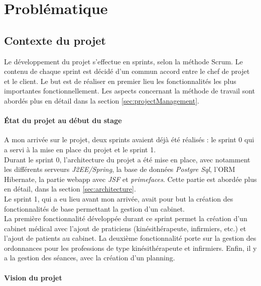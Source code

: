 \newpage
\section{Problématique} %

\subsection{Contexte du projet}
Le développement du projet s'effectue en sprints, selon la méthode Scrum. Le contenu de chaque sprint est décidé d'un commun accord entre le chef de projet et le client. Le but est de réaliser en premier lieu les fonctionnalités les plus importantes fonctionnellement. 
Les aspects concernant la méthode de travail sont abordés plus en détail dans la section \ref{sec:projectManagement}.

\paragraph*{État du projet au début du stage\\}
A mon arrivée sur le projet, deux sprints avaient déjà été réalisés : le sprint 0 qui a servi à la mise en place du projet et le sprint 1.\\

Durant le sprint 0, l'architecture du projet a été mise en place, avec notamment les différents serveurs \textit{J2EE/Spring}, la base de données \textit{Postgre Sql}, l'\gls{ORM} Hibernate, la partie webapp avec \textit{JSF} et \textit{primefaces}.
Cette partie est abordée plus en détail, dans la section \ref{sec:architecture}.\\

Le sprint 1, qui a eu lieu avant mon arrivée, avait pour but la création des fonctionnalités de base permettant la gestion d'un cabinet.\\
La première fonctionnalité développée durant ce sprint permet la création d'un cabinet médical avec l'ajout de praticiens (kinésithérapeute, infirmiers, etc.) et l'ajout de patients au cabinet.
La deuxième fonctionnalité porte sur la gestion des ordonnances pour les professions de type kinésithérapeute et infirmiers. Enfin, il y a la gestion des séances, avec la création d'un planning.

\paragraph*{Vision du projet\\}

